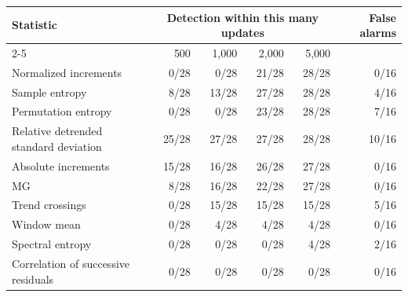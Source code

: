 \begin{tabular}{lrrrrr}
\toprule
Statistic & \multicolumn{4}{c}{Detection within this many updates} & False alarms \\
\cmidrule(lr){2-5}
 & 500 & 1,000 & 2,000 & 5,000 & \\
\midrule
Normalized increments & 0/28 & 0/28 & 21/28 & 28/28 & 0/16 \\
Sample entropy & 8/28 & 13/28 & 27/28 & 28/28 & 4/16 \\
Permutation entropy & 0/28 & 0/28 & 23/28 & 28/28 & 7/16 \\
Relative detrended standard deviation & 25/28 & 27/28 & 27/28 & 28/28 & 10/16 \\
Absolute increments & 15/28 & 16/28 & 26/28 & 27/28 & 0/16 \\
MG & 8/28 & 16/28 & 22/28 & 27/28 & 0/16 \\
Trend crossings & 0/28 & 15/28 & 15/28 & 15/28 & 5/16 \\
Window mean & 0/28 & 4/28 & 4/28 & 4/28 & 0/16 \\
Spectral entropy & 0/28 & 0/28 & 0/28 & 4/28 & 2/16 \\
Correlation of successive residuals & 0/28 & 0/28 & 0/28 & 0/28 & 0/16 \\
\bottomrule
\end{tabular}

